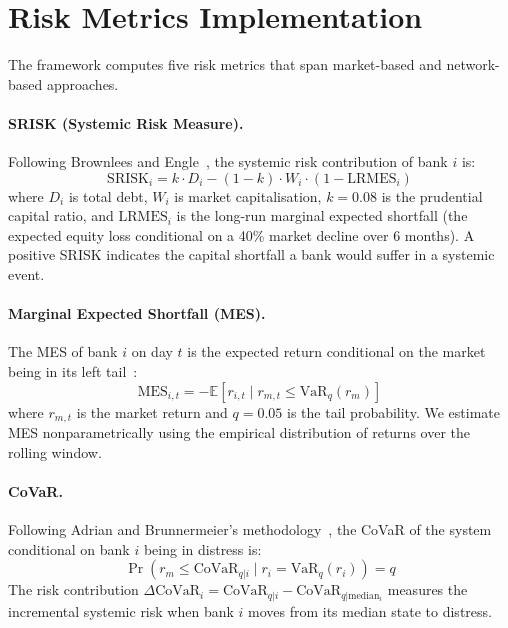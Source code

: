 \section{Risk Metrics Implementation}
\label{sec:risk-metrics}

The framework computes five risk metrics that span market-based and network-based approaches.

\paragraph{SRISK (Systemic Risk Measure).}
Following Brownlees and Engle~\cite{brownlees2017srisk}, the systemic risk contribution of bank $i$ is:
\begin{equation}
    \text{SRISK}_i = k \cdot D_i - (1-k) \cdot W_i \cdot (1 - \text{LRMES}_i)
    \label{eq:srisk}
\end{equation}
where $D_i$ is total debt, $W_i$ is market capitalisation, $k = 0.08$ is the prudential capital ratio, and $\text{LRMES}_i$ is the long-run marginal expected shortfall (the expected equity loss conditional on a 40\% market decline over 6 months). A positive SRISK indicates the capital shortfall a bank would suffer in a systemic event.

\paragraph{Marginal Expected Shortfall (MES).}
The MES of bank $i$ on day $t$ is the expected return conditional on the market being in its left tail~\cite{acharya2017measuring}:
\begin{equation}
    \text{MES}_{i,t} = -\mathbb{E}\left[r_{i,t} \mid r_{m,t} \leq \text{VaR}_{q}(r_m)\right]
    \label{eq:mes}
\end{equation}
where $r_{m,t}$ is the market return and $q = 0.05$ is the tail probability. We estimate MES nonparametrically using the empirical distribution of returns over the rolling window.

\paragraph{CoVaR.}
Following Adrian and Brunnermeier's methodology~\cite{bisias2012survey}, the CoVaR of the system conditional on bank $i$ being in distress is:
\begin{equation}
    \Pr\left(r_m \leq \text{CoVaR}_{q|i} \mid r_i = \text{VaR}_q(r_i)\right) = q
    \label{eq:covar}
\end{equation}
The risk contribution $\Delta\text{CoVaR}_i = \text{CoVaR}_{q|i} - \text{CoVaR}_{q|\text{median}_i}$ measures the incremental systemic risk when bank $i$ moves from its median state to distress.

